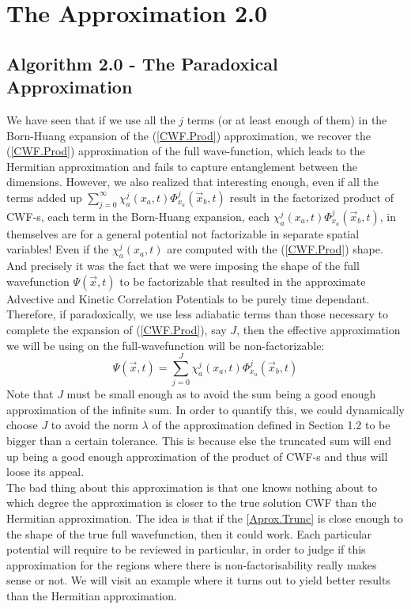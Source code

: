 \documentclass[11pt, a4paper]{article} %
\begin{document}
\section{The Approximation 2.0}
\subsection{Algorithm 2.0 - The Paradoxical Approximation }
We have seen that if we use all the $j$ terms (or at least enough of them) in the Born-Huang expansion of the (\ref{CWF.Prod}) approximation, we recover the (\ref{CWF.Prod}) approximation of the full wave-function, which leads to the Hermitian approximation and fails to capture entanglement between the dimensions. However, we also realized that interesting enough, even if all the terms added up $\sum_{j=0}^\infty \chi_a^j(x_a,t) \Phi_{x_a}^j(\vec{x}_b,t)$ result in the factorized product of CWF-s, each term in the Born-Huang expansion, each $\chi_a^j(x_a,t) \Phi_{x_a}^j(\vec{x}_b,t)$, in themselves are for a general potential not factorizable in separate spatial variables! Even if the $\chi_a^j(x_a,t)$ are computed with the (\ref{CWF.Prod}) shape. And precisely it was the fact that we were imposing the shape of the full wavefunction $\Psi(\vec{x},t)$ to be factorizable that resulted in the approximate Advective and Kinetic Correlation Potentials to be purely time dependant. Therefore, if paradoxically, we use less adiabatic terms than those necessary to complete the expansion of (\ref{CWF.Prod}), say $J$, then the effective approximation we will be using on the full-wavefunction will be non-factorizable:
\begin{equation}\label{Aprox.Trunc}\tag{Aprox.Trunc}
\Psi(\vec{x},t)=\sum_{j=0}^J \chi_a^j(x_a,t) \Phi_{x_a}^j(\vec{x}_b,t)
\end{equation}
Note that $J$ must be small enough as to avoid the sum being a good enough approximation of the infinite sum. In order to quantify this, we could dynamically choose $J$ to avoid the norm $\lambda$ of the approximation defined in Section 1.2 to be bigger than a certain tolerance. This is because else the truncated sum will end up being a good enough approximation of the product of CWF-s and thus will loose its appeal.\\

The bad thing about this approximation is that one knows nothing about to which degree the approximation is closer to the true solution CWF than the Hermitian approximation. The idea is that if the \ref{Aprox.Trunc} is close enough to the shape of the true full wavefunction, then it could work. Each particular potential will require to be reviewed in particular, in order to judge if this approximation for the regions where there is non-factorisability really makes sense or not. We will visit an example where it turns out to yield better results than the Hermitian approximation.
\end{document}
